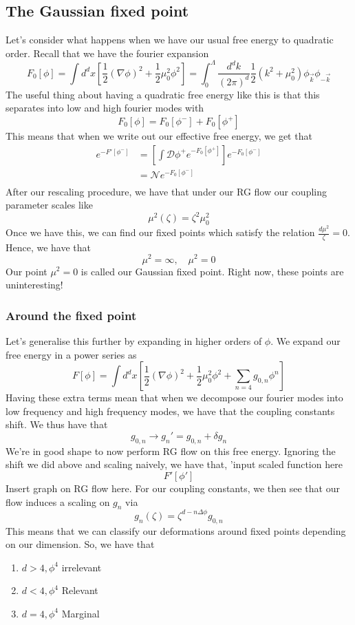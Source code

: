 \documentclass[11pt, oneside]{article}   	%
\begin{document}
\subsection{The Gaussian fixed point} 
Let's consider what happens 
when we have our usual free energy to quadratic order. 
Recall that we have the fourier expansion 
\[
	F _ 0 [ \phi ] = \int d^ d x \left[  \frac{1}{2 } ( \nabla \phi ) ^ 2 + \frac{1}{2 } \mu _ 0 ^ 2 \phi ^ 2 \right] = \int_ 0 ^ \Lambda \frac{ d^ d k }{ ( 2 \pi ) ^ d } \frac{1}{2 } \left(  k ^ 2 + \mu_ 0 ^ 2   \right)  \phi 
	_{ \vec{k} } \phi _{ - \vec{k}}
\] The useful thing about having 
a quadratic free energy like this 
is that this separates into low and high 
fourier modes with 
\[
	F _ 0 [ \phi ] = F_0 [ \phi ^ - ] + F _ 0 [ \phi ^ + ] 
\] This means that when we write out 
our effective free energy, we get that 
\begin{align*}
	e ^{  - F ' [ \phi ^ - ] } &= \left[  \int \mathcal{ D } \phi ^ + 
	e ^{  - F _ 0 [ \phi ^ +  ] }\right] e^{  - F_0 [ \phi ^ -  ] }    \\
				   &=  \mathcal{ N } e ^{  - F_ 0 [ \phi ^ - ] } \\
\end{align*}
After our rescaling procedure, 
we have that under our RG flow our 
coupling parameter scales like 
\[
 \mu ^ 2 ( \zeta ) = \zeta ^ 2 \mu ^ 2 _ 0 
\] Once we have this, we can find 
our fixed points which satisfy the relation 
$ \frac{ d \mu ^ 2  }{ \zeta} =0  $. Hence, we 
have that 
\[
 \mu ^ 2 = \infty, \quad \mu ^ 2 = 0  
\] Our point $ \mu ^ 2  = 0 $ is called our Gaussian 
fixed point. Right now, these
points are uninteresting!

\subsubsection{Around the fixed point} 
Let's generalise this further by expanding 
in higher orders of $ \phi $. 
We expand our free energy in a power series as
 \[
	 F [ \phi ]  = \int d ^ d x \left[ \frac{1}{2 } ( \nabla \phi ) ^ 2 + 
	 \frac{1}{2 } \mu ^ 2 _ 0 \phi ^ 2 + \sum_{ n = 4 } g_{ 0 , n } \phi ^ n \right]  
\]  Having these
extra terms mean that when we decompose our 
fourier modes into low frequency and 
high frequency modes, we have that 
the coupling constants shift. We thus have that 
\[
 g _{ 0 , n } \to g_{ n } ' = g _{ 0 , n } + \delta g _{ n }
\] We're in good shape to now 
perform RG flow on this free energy. 
Ignoring the shift we did above and scaling naively, 
we have that, 'input scaled function here
\[
 F ' [ \phi ' ] 
\] Insert graph on RG flow here.  
For our coupling constants, we 
then see that our flow induces a scaling on 
$ g_n $ via 
\[
 g _ n ( \zeta ) = \zeta ^{ d - n \Delta \phi } g_{ 0 , n }
\] This means that we can classify 
our deformations around fixed points depending on 
our dimension. So, we have that 
\begin{enumerate}
	\item $ d > 4 , \phi ^ 4 $ irrelevant 
	\item $ d < 4 , \phi ^ 4 $ Relevant 
	\item $ d  = 4, \phi ^ 4 $ Marginal 
\end{enumerate} 
\end{document}

